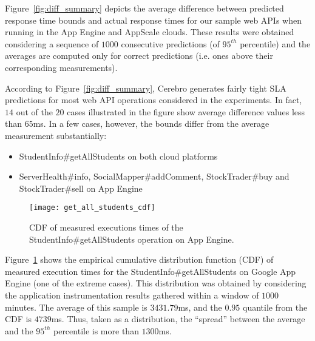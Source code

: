 Figure~\ref{fig:diff_summary} depicts the average difference between predicted
response time bounds and actual response times for
our sample web APIs when running in the App Engine and AppScale clouds. 
These results were obtained considering a sequence of $1000$ 
consecutive predictions (of $95^{th}$ percentile) and the averages are
computed only for correct predictions (i.e. ones above their corresponding
measurements).

According to Figure~\ref{fig:diff_summary}, Cerebro generates fairly tight 
SLA predictions for most web API operations considered in the experiments. In fact,
$14$ out of the $20$ cases illustrated in the figure show average difference
values less than $65$ms. In a few cases, however, the bounds differ from the
average measurement substantially:
\begin{itemize}
\vspace{-0.05in}
\item StudentInfo\#getAllStudents on both cloud platforms
\vspace{-0.05in}
\item ServerHealth\#info, SocialMapper\#addComment, StockTrader\#buy and StockTrader\#sell on App Engine
\vspace{-0.05in}
\end{itemize}


\begin{figure}
\centering
\texttt{[image: get\_all\_students\_cdf]}
\caption{CDF of measured executions times of the StudentInfo\#getAllStudents operation on App Engine.}
\label{fig:get_all_students_cdf}
\vspace{-0.2in}
\end{figure}

Figure~\ref{fig:get_all_students_cdf} shows the empirical cumulative
distribution function (CDF) of measured execution times for the 
StudentInfo\#getAllStudents on
Google App Engine (one of the extreme cases). 
This distribution was obtained by considering the application instrumentation 
results gathered within a window of $1000$ minutes. 
The average of this sample is $3431.79$ms, and the $0.95$ quantile
from the CDF is $4739$ms.  Thus, taken as a distribution, the ``spread''
between the average and the $95^{th}$ percentile is more
than $1300$ms.  

